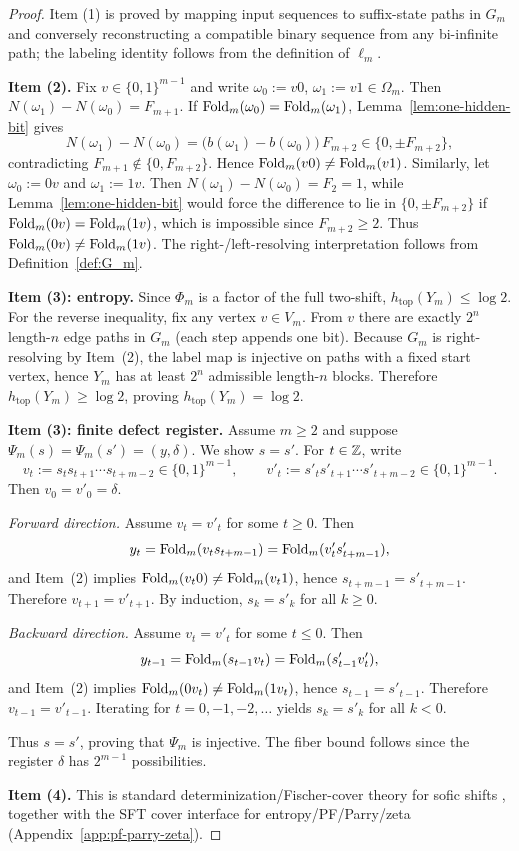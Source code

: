 \begin{proof}
Item (1) is proved by mapping input sequences to suffix-state paths in $G_m$ and conversely reconstructing a compatible binary sequence from any bi-infinite path; the labeling identity follows from the definition of $\ell_m$.
\par
\textbf{Item (2).}
Fix $v\in\{0,1\}^{m-1}$ and write $\omega_0:=v0$, $\omega_1:=v1\in\Omega_m$.
Then $N(\omega_1)-N(\omega_0)=F_{m+1}$.
If $\mathrm{Fold}_m(\omega_0)=\mathrm{Fold}_m(\omega_1)$, Lemma~\ref{lem:one-hidden-bit} gives
\[
N(\omega_1)-N(\omega_0)=\bigl(b(\omega_1)-b(\omega_0)\bigr)\,F_{m+2}\in\{0,\pm F_{m+2}\},
\]
contradicting $F_{m+1}\notin\{0,F_{m+2}\}$. Hence $\mathrm{Fold}_m(v0)\neq\mathrm{Fold}_m(v1)$.
Similarly, let $\omega_0:=0v$ and $\omega_1:=1v$.
Then $N(\omega_1)-N(\omega_0)=F_2=1$, while Lemma~\ref{lem:one-hidden-bit} would force the difference to lie in $\{0,\pm F_{m+2}\}$ if $\mathrm{Fold}_m(0v)=\mathrm{Fold}_m(1v)$, which is impossible since $F_{m+2}\ge 2$.
Thus $\mathrm{Fold}_m(0v)\neq\mathrm{Fold}_m(1v)$. The right-/left-resolving interpretation follows from Definition~\ref{def:G_m}.
\par
\textbf{Item (3): entropy.}
Since $\Phi_m$ is a factor of the full two-shift, $h_{\mathrm{top}}(Y_m)\le \log 2$.
For the reverse inequality, fix any vertex $v\in V_m$.
From $v$ there are exactly $2^n$ length-$n$ edge paths in $G_m$ (each step appends one bit).
Because $G_m$ is right-resolving by Item~(2), the label map is injective on paths with a fixed start vertex, hence $Y_m$ has at least $2^n$ admissible length-$n$ blocks.
Therefore $h_{\mathrm{top}}(Y_m)\ge \log 2$, proving $h_{\mathrm{top}}(Y_m)=\log 2$.
\par
\textbf{Item (3): finite defect register.}
Assume $m\ge 2$ and suppose $\Psi_m(s)=\Psi_m(s')=(y,\delta)$.
We show $s=s'$.
For $t\in\mathbb{Z}$, write
\[
v_t:=s_t s_{t+1}\cdots s_{t+m-2}\in\{0,1\}^{m-1},\qquad
v'_t:=s'_t s'_{t+1}\cdots s'_{t+m-2}\in\{0,1\}^{m-1}.
\]
Then $v_0=v'_0=\delta$.
\par
\emph{Forward direction.}
Assume $v_t=v'_t$ for some $t\ge 0$.
Then
\[
y_t=\mathrm{Fold}_m(v_t s_{t+m-1})=\mathrm{Fold}_m(v'_t s'_{t+m-1}),
\]
and Item~(2) implies $\mathrm{Fold}_m(v_t0)\neq\mathrm{Fold}_m(v_t1)$, hence $s_{t+m-1}=s'_{t+m-1}$.
Therefore $v_{t+1}=v'_{t+1}$.
By induction, $s_k=s'_k$ for all $k\ge 0$.
\par
\emph{Backward direction.}
Assume $v_t=v'_t$ for some $t\le 0$.
Then
\[
y_{t-1}=\mathrm{Fold}_m(s_{t-1}v_t)=\mathrm{Fold}_m(s'_{t-1}v'_t),
\]
and Item~(2) implies $\mathrm{Fold}_m(0v_t)\neq\mathrm{Fold}_m(1v_t)$, hence $s_{t-1}=s'_{t-1}$.
Therefore $v_{t-1}=v'_{t-1}$.
Iterating for $t=0,-1,-2,\dots$ yields $s_k=s'_k$ for all $k<0$.
\par
Thus $s=s'$, proving that $\Psi_m$ is injective.
The fiber bound follows since the register $\delta$ has $2^{m-1}$ possibilities.
\par
\textbf{Item (4).}
This is standard determinization/Fischer-cover theory for sofic shifts \cite{LindMarcus1995,Kitchens1998SymbolicDynamics}, together with the SFT cover interface for entropy/PF/Parry/zeta (Appendix~\ref{app:pf-parry-zeta}).
\end{proof}


